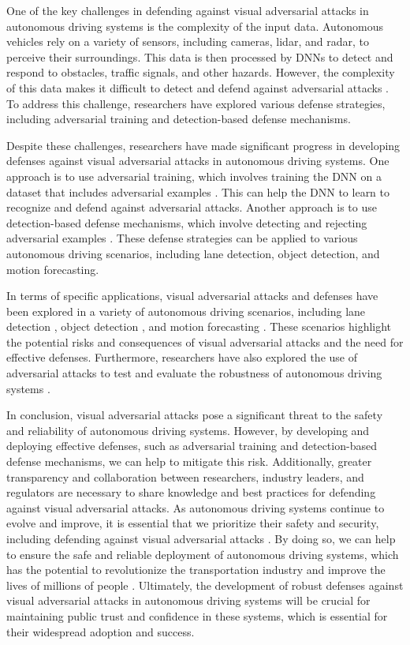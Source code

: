 \documentclass[11pt]{article}
\begin{document}
One of the key challenges in defending against visual adversarial attacks in autonomous driving systems is the complexity of the input data. Autonomous vehicles rely on a variety of sensors, including cameras, lidar, and radar, to perceive their surroundings. This data is then processed by DNNs to detect and respond to obstacles, traffic signals, and other hazards. However, the complexity of this data makes it difficult to detect and defend against adversarial attacks \cite{ref110}. To address this challenge, researchers have explored various defense strategies, including adversarial training and detection-based defense mechanisms.

Despite these challenges, researchers have made significant progress in developing defenses against visual adversarial attacks in autonomous driving systems. One approach is to use adversarial training, which involves training the DNN on a dataset that includes adversarial examples \cite{ref77}. This can help the DNN to learn to recognize and defend against adversarial attacks. Another approach is to use detection-based defense mechanisms, which involve detecting and rejecting adversarial examples \cite{ref111}. These defense strategies can be applied to various autonomous driving scenarios, including lane detection, object detection, and motion forecasting.

In terms of specific applications, visual adversarial attacks and defenses have been explored in a variety of autonomous driving scenarios, including lane detection \cite{ref112}, object detection \cite{ref113}, and motion forecasting \cite{ref114}. These scenarios highlight the potential risks and consequences of visual adversarial attacks and the need for effective defenses. Furthermore, researchers have also explored the use of adversarial attacks to test and evaluate the robustness of autonomous driving systems \cite{ref115}.

In conclusion, visual adversarial attacks pose a significant threat to the safety and reliability of autonomous driving systems. However, by developing and deploying effective defenses, such as adversarial training and detection-based defense mechanisms, we can help to mitigate this risk. Additionally, greater transparency and collaboration between researchers, industry leaders, and regulators are necessary to share knowledge and best practices for defending against visual adversarial attacks. As autonomous driving systems continue to evolve and improve, it is essential that we prioritize their safety and security, including defending against visual adversarial attacks \cite{ref116}. By doing so, we can help to ensure the safe and reliable deployment of autonomous driving systems, which has the potential to revolutionize the transportation industry and improve the lives of millions of people \cite{ref117}. Ultimately, the development of robust defenses against visual adversarial attacks in autonomous driving systems will be crucial for maintaining public trust and confidence in these systems, which is essential for their widespread adoption and success.
\end{document}
